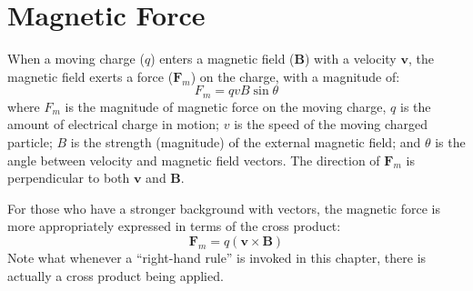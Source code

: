 \section{Magnetic Force}

%  
%
%
%  
%
%
%
%
When a moving charge ($q$) enters a magnetic field ($\bm B$) with a velocity
$\bm v$, the magnetic field exerts a force ($\bm F_m$) on the charge, with
a magnitude of:
\begin{equation}
  \boxed{
    F_m=qvB\sin\theta
  }
\end{equation}
where $F_m$ is the magnitude of magnetic force on the moving charge, $q$ is
the amount of electrical charge in motion; $v$ is the speed of the moving
charged particle; $B$ is the strength (magnitude) of the external magnetic
field; and $\theta$ is the angle between velocity and magnetic field
vectors. The direction of $\bm F_m$ is perpendicular to both $\bm v$ and
$\bm B$. 
\begin{remark}
  For those who have a stronger background with vectors, the magnetic force
  is more appropriately expressed in terms of the cross product:
  \begin{equation*}
    \bm F_m=q(\bm v\times\bm B)
  \end{equation*}
  Note what whenever a ``right-hand rule'' is invoked in this chapter, there
  is actually a cross product being applied.
\end{remark}




